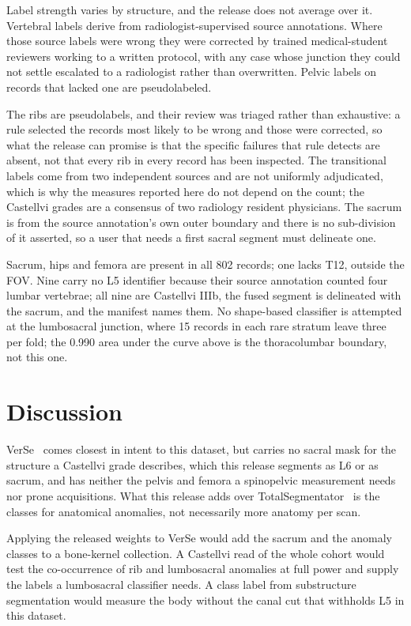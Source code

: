 \documentclass[aapm,mph,amsmath,amssymb,preprint,linenumbers]{revtex4-2}
\begin{document}
Label strength varies by structure, and the release does not average over it.
Vertebral labels derive from radiologist-supervised source annotations. Where those source
labels were wrong they were corrected by trained medical-student reviewers working to a
written protocol, with any case whose junction they could not settle escalated to a
radiologist rather than overwritten. Pelvic labels on records that lacked one are
pseudolabeled.

The ribs are pseudolabels, and their review was triaged rather than exhaustive: a rule
selected the records most likely to be wrong and those were corrected, so what the release
can promise is that the specific failures that rule detects are absent, not that every rib
in every record has been inspected. The transitional labels come from two independent
sources and are not uniformly adjudicated, which is why the measures reported here do not
depend on the count; the Castellvi grades are a consensus of two radiology resident
physicians. The sacrum is from the source annotation's own outer
boundary and there is no sub-division of it asserted, so a user that needs a first sacral
segment must delineate one.

Sacrum, hips and femora are present in all 802 records; one lacks T12, outside the FOV. Nine
carry no L5 identifier because their source annotation counted four lumbar vertebrae; all nine
are Castellvi IIIb, the fused segment is delineated with the sacrum, and the manifest names
them. No shape-based classifier is attempted at the lumbosacral junction, where 15 records in
each rare stratum leave three per fold; the 0.990 area under the curve above is the
thoracolumbar boundary, not this one.

\section{Discussion}

VerSe~\cite{verse2021,versedata2021} comes closest in intent to this dataset, but carries no
sacral mask for the structure a Castellvi grade describes, which this release segments as L6
or as sacrum, and has neither the pelvis and femora a spinopelvic measurement needs nor prone
acquisitions. What this release adds
over TotalSegmentator~\cite{totalsegmentator} is the classes for anatomical anomalies, not necessarily more
anatomy per scan.

Applying the released weights to VerSe would add the sacrum and the
anomaly classes to a bone-kernel collection. A Castellvi read of the whole cohort
would test the co-occurrence of rib and lumbosacral anomalies at full power and supply the
labels a lumbosacral classifier needs. A class label from substructure
segmentation\cite{spineps2025} would measure the body without the canal cut that withholds
L5 in this dataset.
\end{document}
